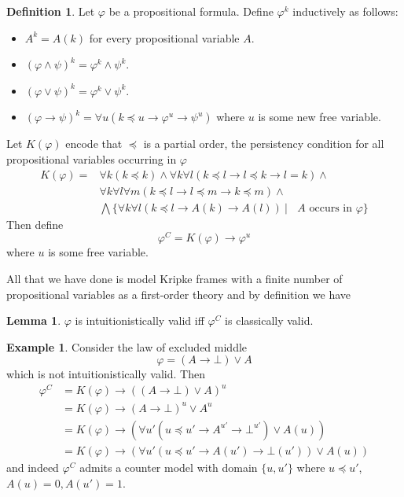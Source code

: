 \documentclass[a4paper,12pt]{report}
\theoremstyle{definition}
\theoremstyle{definition}
\theoremstyle{definition}
\newtheorem{lemma}[theorem]{Lemma}
\theoremstyle{definition}
\theoremstyle{definition}
\newtheorem{definition}[theorem]{Definition}
\theoremstyle{definition}
\newtheorem{example}[theorem]{Example}
\theoremstyle{definition}
\begin{document}
	\begin{definition}
		Let $\varphi$ be a propositional formula. Define $\varphi^{k}$ inductively as follows:
		\begin{itemize}
			\item $A^{k} = A(k)$ for every propositional variable $A$.
			\item $(\varphi\wedge\psi)^k = \varphi^k\wedge\psi^k$.
			\item $(\varphi\vee\psi)^k = \varphi^k\vee\psi^k$.
			\item $(\varphi\to \psi)^k = \forall u(k\preceq u\to\varphi^{u}\to\psi^{u})$ where $u$ is some new free variable.
		\end{itemize}
		Let $K(\varphi)$ encode that $\preceq$ is a partial order, the persistency condition for all propositional variables occurring in $\varphi$
		\begin{align*}
			K(\varphi) = &\forall k(k\preceq k)\wedge \forall k\forall l(k\preceq l\to l\preceq k\to l = k) \wedge \\&\forall k\forall l\forall m(k\preceq l \to l\preceq m\to k\preceq m)\wedge\\&\bigwedge \{\forall k\forall l(k\preceq l\to A(k)\to A(l))\:|\: \text{ $A$ occurs in $\varphi$}\}
		\end{align*}
		Then define
		$$\varphi^{C} = K(\varphi)\to \varphi^{u}$$
		where $u$ is some free variable.
	\end{definition}

	All that we have done is model Kripke frames with a finite number of propositional variables as a first-order theory and by definition we have

	\begin{lemma}
		$\varphi$ is intuitionistically valid iff $\varphi^C$ is classically valid.
	\end{lemma}

	\begin{example}
		Consider the law of excluded middle $$\varphi = (A\to \bot)\vee A$$ which is not intuitionistically valid. Then
		\begin{align*}
			\varphi^{C} &= K(\varphi)\to ((A\to \bot)\vee A)^u\\
						 &= K(\varphi)\to (A\to \bot)^u\vee A^u\\
						 &= K(\varphi)\to (\forall u'( u\preceq u' \to A^{u'}\to \bot^{u'})\vee A(u))\\
						 &= K(\varphi)\to (\forall u' (u\preceq u' \to A(u')\to \bot(u'))\vee A(u))
		\end{align*}
		and indeed $\varphi^{C}$ admits a counter model with domain $\{u, u'\}$ where $u \preceq u'$, $A(u) = 0, A(u') = 1$.
	\end{example}
	
\end{document}
